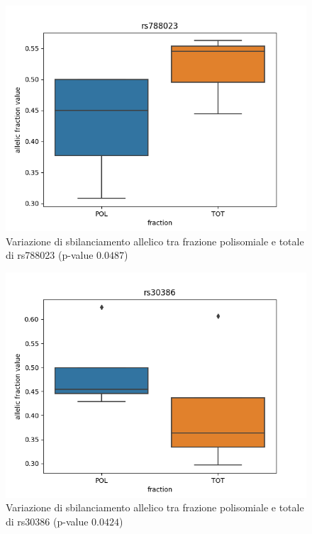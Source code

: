 \begin{multicols}{2}
\begin{figure}[H]
  \centering
  \includegraphics[scale=0.5]{scr_NUTLIN_rs788023.png}
  \caption{Variazione di sbilanciamento allelico tra frazione polisomiale e totale di rs788023 (p-value $0.0487$)}
  \label{fig:SF3B1}
\end{figure}

\begin{figure}[H]
  \centering
  \includegraphics[scale=0.5]{scr_NUTLIN_rs30386.png}
  \caption{Variazione di sbilanciamento allelico tra frazione polisomiale e totale di rs30386 (p-value $0.0424$)}
  \label{fig:TBC1D9B}
\end{figure}


\end{multicols}
